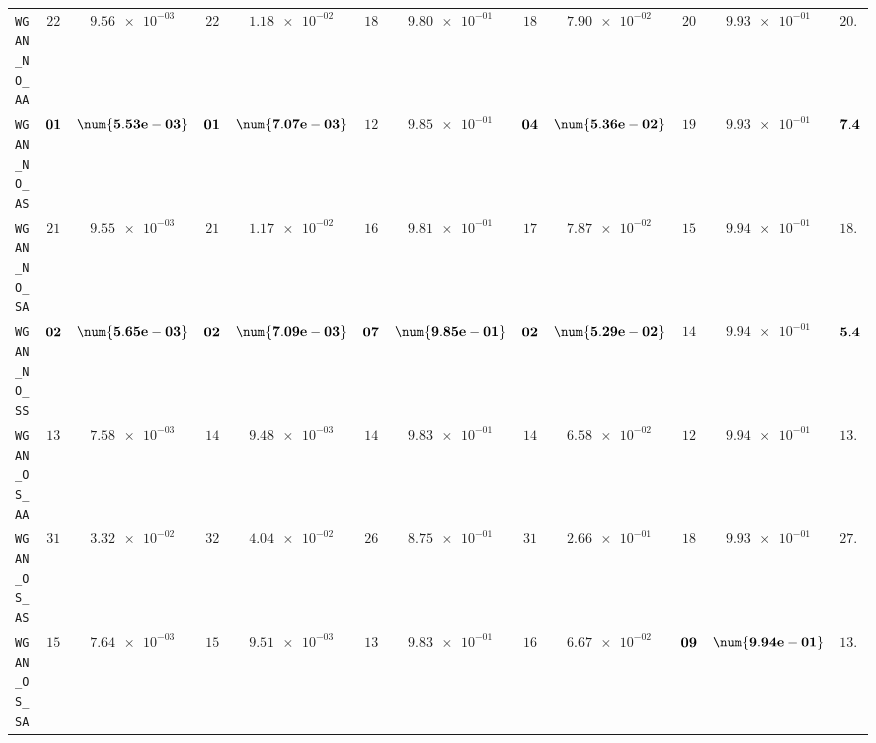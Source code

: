 \begin{xltabular}{\textwidth}{l||cC|cC|cC|cC|cC||c}
	\texttt{WGAN\_NO\_AA} & $ 22$ & $ \num{9.56e-03}$ & $ 22$ & $ \num{1.18e-02}$ & $ 18$ & $ \num{9.80e-01}$ & $ 18$ & $ \num{7.90e-02}$ & $ 20$ & $ \num{9.93e-01}$ & $ 20.0$  \\
	\texttt{WGAN\_NO\_AS} & $\bf 01$ & $\bf \num{5.53e-03}$ & $\bf 01$ & $\bf \num{7.07e-03}$ & $ 12$ & $ \num{9.85e-01}$ & $\bf 04$ & $\bf \num{5.36e-02}$ & $ 19$ & $ \num{9.93e-01}$ & $\bf 7.4$  \\
	\texttt{WGAN\_NO\_SA} & $ 21$ & $ \num{9.55e-03}$ & $ 21$ & $ \num{1.17e-02}$ & $ 16$ & $ \num{9.81e-01}$ & $ 17$ & $ \num{7.87e-02}$ & $ 15$ & $ \num{9.94e-01}$ & $ 18.0$  \\
	\texttt{WGAN\_NO\_SS} & $\bf 02$ & $\bf \num{5.65e-03}$ & $\bf 02$ & $\bf \num{7.09e-03}$ & $\bf 07$ & $\bf \num{9.85e-01}$ & $\bf 02$ & $\bf \num{5.29e-02}$ & $ 14$ & $ \num{9.94e-01}$ & $\bf 5.4$  \\
	\texttt{WGAN\_OS\_AA} & $ 13$ & $ \num{7.58e-03}$ & $ 14$ & $ \num{9.48e-03}$ & $ 14$ & $ \num{9.83e-01}$ & $ 14$ & $ \num{6.58e-02}$ & $ 12$ & $ \num{9.94e-01}$ & $ 13.4$  \\
	\texttt{WGAN\_OS\_AS} & $ 31$ & $ \num{3.32e-02}$ & $ 32$ & $ \num{4.04e-02}$ & $ 26$ & $ \num{8.75e-01}$ & $ 31$ & $ \num{2.66e-01}$ & $ 18$ & $ \num{9.93e-01}$ & $ 27.6$  \\
	\texttt{WGAN\_OS\_SA} & $ 15$ & $ \num{7.64e-03}$ & $ 15$ & $ \num{9.51e-03}$ & $ 13$ & $ \num{9.83e-01}$ & $ 16$ & $ \num{6.67e-02}$ & $\bf 09$ & $\bf \num{9.94e-01}$ & $ 13.6$  \\

\end{xltabular}
